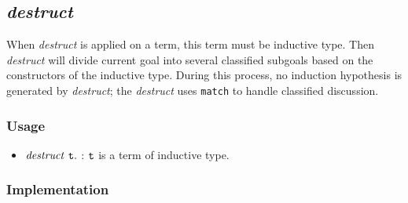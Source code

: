 \subsection{\it destruct}

When {\it destruct} is applied on a term, this term must be inductive type. Then {\it destruct} will divide current goal
into several classified subgoals based on the constructors of the inductive type. During this process, no induction 
hypothesis is generated by {\it destruct}; the {\it destruct} uses {\tt match} to handle classified discussion.

\subsubsection*{Usage}
\begin{itemize}
\item ${\it destruct}\ \tt t.$ : $\tt t$ is a term of inductive type. 
\end{itemize}

\subsubsection*{Implementation}

